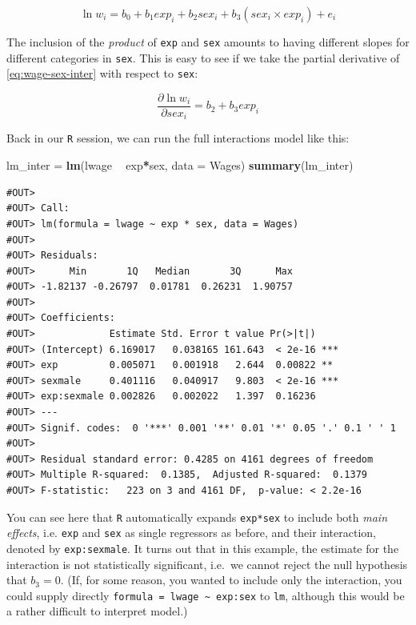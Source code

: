 \documentclass[]{book}
\newenvironment{Shaded}{\begin{snugshade}}{\end{snugshade}}
\newcommand{\KeywordTok}[1]{\textcolor[rgb]{0.13,0.29,0.53}{\textbf{#1}}}
\newcommand{\DataTypeTok}[1]{\textcolor[rgb]{0.13,0.29,0.53}{#1}}
\newcommand{\StringTok}[1]{\textcolor[rgb]{0.31,0.60,0.02}{#1}}
\newcommand{\OperatorTok}[1]{\textcolor[rgb]{0.81,0.36,0.00}{\textbf{#1}}}
\newcommand{\NormalTok}[1]{#1}
\theoremstyle{definition}
\theoremstyle{definition}
\theoremstyle{definition}
\theoremstyle{remark}
\begin{document}
\[
\ln w_i = b_0 + b_1 exp_i + b_2 sex_i + b_3 (sex_i \times exp_i) + e_i \label{eq:wage-sex-inter}
\]

The inclusion of the \emph{product} of \texttt{exp} and \texttt{sex}
amounts to having different slopes for different categories in
\texttt{sex}. This is easy to see if we take the partial derivative of
\eqref{eq:wage-sex-inter} with respect to \texttt{sex}:

\[
\frac{\partial \ln w_i}{\partial sex_i} = b_2 + b_3 exp_i \label{eq:wage-sex-inter-deriv}
\]

Back in our \texttt{R} session, we can run the full interactions model
like this:

\begin{Shaded}
\begin{Highlighting}[]
\NormalTok{lm_inter =}\StringTok{ }\KeywordTok{lm}\NormalTok{(lwage }\OperatorTok{~}\StringTok{ }\NormalTok{exp}\OperatorTok{*}\NormalTok{sex, }\DataTypeTok{data =}\NormalTok{ Wages)}
\KeywordTok{summary}\NormalTok{(lm_inter)}
\end{Highlighting}
\end{Shaded}

\begin{verbatim}
#OUT> 
#OUT> Call:
#OUT> lm(formula = lwage ~ exp * sex, data = Wages)
#OUT> 
#OUT> Residuals:
#OUT>      Min       1Q   Median       3Q      Max 
#OUT> -1.82137 -0.26797  0.01781  0.26231  1.90757 
#OUT> 
#OUT> Coefficients:
#OUT>             Estimate Std. Error t value Pr(>|t|)    
#OUT> (Intercept) 6.169017   0.038165 161.643  < 2e-16 ***
#OUT> exp         0.005071   0.001918   2.644  0.00822 ** 
#OUT> sexmale     0.401116   0.040917   9.803  < 2e-16 ***
#OUT> exp:sexmale 0.002826   0.002022   1.397  0.16236    
#OUT> ---
#OUT> Signif. codes:  0 '***' 0.001 '**' 0.01 '*' 0.05 '.' 0.1 ' ' 1
#OUT> 
#OUT> Residual standard error: 0.4285 on 4161 degrees of freedom
#OUT> Multiple R-squared:  0.1385,  Adjusted R-squared:  0.1379 
#OUT> F-statistic:   223 on 3 and 4161 DF,  p-value: < 2.2e-16
\end{verbatim}

You can see here that \texttt{R} automatically expands \texttt{exp*sex}
to include both \emph{main effects}, i.e. \texttt{exp} and \texttt{sex}
as single regressors as before, and their interaction, denoted by
\texttt{exp:sexmale}. It turns out that in this example, the estimate
for the interaction is not statistically significant, i.e.~we cannot
reject the null hypothesis that \(b_3 = 0\). (If, for some reason, you
wanted to include only the interaction, you could supply directly
\texttt{formula\ =\ lwage\ \textasciitilde{}\ exp:sex} to \texttt{lm},
although this would be a rather difficult to interpret model.)
\end{document}
